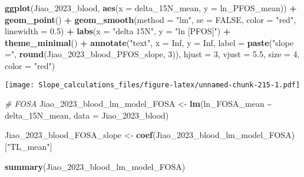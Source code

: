 \documentclass[
]{article}
\newenvironment{Shaded}{\begin{snugshade}}{\end{snugshade}}
\newcommand{\AttributeTok}[1]{\textcolor[rgb]{0.13,0.29,0.53}{#1}}
\newcommand{\CommentTok}[1]{\textcolor[rgb]{0.56,0.35,0.01}{\textit{#1}}}
\newcommand{\ConstantTok}[1]{\textcolor[rgb]{0.56,0.35,0.01}{#1}}
\newcommand{\DecValTok}[1]{\textcolor[rgb]{0.00,0.00,0.81}{#1}}
\newcommand{\FloatTok}[1]{\textcolor[rgb]{0.00,0.00,0.81}{#1}}
\newcommand{\FunctionTok}[1]{\textcolor[rgb]{0.13,0.29,0.53}{\textbf{#1}}}
\newcommand{\NormalTok}[1]{#1}
\newcommand{\OtherTok}[1]{\textcolor[rgb]{0.56,0.35,0.01}{#1}}
\newcommand{\SpecialCharTok}[1]{\textcolor[rgb]{0.81,0.36,0.00}{\textbf{#1}}}
\newcommand{\StringTok}[1]{\textcolor[rgb]{0.31,0.60,0.02}{#1}}
\begin{document}
\begin{Shaded}
\begin{Highlighting}[]
\FunctionTok{ggplot}\NormalTok{(Jiao\_2023\_blood, }\FunctionTok{aes}\NormalTok{(}\AttributeTok{x =}\NormalTok{ delta\_15N\_mean, }\AttributeTok{y =}\NormalTok{ ln\_PFOS\_mean)) }\SpecialCharTok{+}
  \FunctionTok{geom\_point}\NormalTok{() }\SpecialCharTok{+}
  \FunctionTok{geom\_smooth}\NormalTok{(}\AttributeTok{method =} \StringTok{"lm"}\NormalTok{, }\AttributeTok{se =} \ConstantTok{FALSE}\NormalTok{, }\AttributeTok{color =} \StringTok{"red"}\NormalTok{, }\AttributeTok{linewidth =} \FloatTok{0.5}\NormalTok{) }\SpecialCharTok{+}
  \FunctionTok{labs}\NormalTok{(}\AttributeTok{x =} \StringTok{"delta 15N"}\NormalTok{,}
       \AttributeTok{y =} \StringTok{"ln [PFOS]"}\NormalTok{) }\SpecialCharTok{+}
  \FunctionTok{theme\_minimal}\NormalTok{() }\SpecialCharTok{+}
  \FunctionTok{annotate}\NormalTok{(}\StringTok{"text"}\NormalTok{, }\AttributeTok{x =} \ConstantTok{Inf}\NormalTok{, }\AttributeTok{y =} \ConstantTok{Inf}\NormalTok{, }\AttributeTok{label =} \FunctionTok{paste}\NormalTok{(}\StringTok{"slope ="}\NormalTok{, }\FunctionTok{round}\NormalTok{(Jiao\_2023\_blood\_PFOS\_slope, }\DecValTok{3}\NormalTok{)), }
           \AttributeTok{hjust =} \DecValTok{3}\NormalTok{, }\AttributeTok{vjust =} \FloatTok{5.5}\NormalTok{, }\AttributeTok{size =} \DecValTok{4}\NormalTok{, }\AttributeTok{color =} \StringTok{"red"}\NormalTok{)}
\end{Highlighting}
\end{Shaded}

\texttt{[image: Slope\_calculations\_files/figure-latex/unnamed-chunk-215-1.pdf]}

\begin{Shaded}
\begin{Highlighting}[]
\CommentTok{\# FOSA}
\NormalTok{Jiao\_2023\_blood\_lm\_model\_FOSA }\OtherTok{\textless{}{-}} \FunctionTok{lm}\NormalTok{(ln\_FOSA\_mean }\SpecialCharTok{\textasciitilde{}}\NormalTok{ delta\_15N\_mean,}
                                    \AttributeTok{data =}\NormalTok{ Jiao\_2023\_blood)}

\NormalTok{Jiao\_2023\_blood\_FOSA\_slope }\OtherTok{\textless{}{-}} \FunctionTok{coef}\NormalTok{(Jiao\_2023\_blood\_lm\_model\_FOSA)[}\StringTok{"TL\_mean"}\NormalTok{]}

\FunctionTok{summary}\NormalTok{(Jiao\_2023\_blood\_lm\_model\_FOSA)}
\end{Highlighting}
\end{Shaded}
\end{document}
